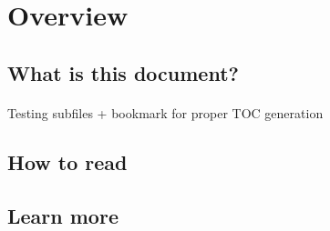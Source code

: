 \documentclass[../../main.tex]{subfiles}
\begin{document}
    \section{Overview}
    \subsection{What is this document?}
    \paragraph{}
    Testing subfiles + bookmark for proper TOC generation
    \subsection{How to read}
    \subsection{Learn more}
\end{document}
